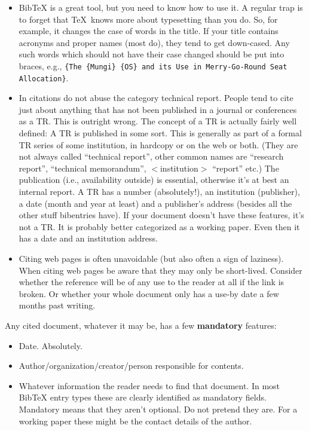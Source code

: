 \begin{itemize}
\item BibTeX is a great tool, but you need to know how to use it. A regular trap is to forget that \TeX~knows more about typesetting than you do. So, for example, it changes the case of words in the title. If your title contains acronyms and proper names (most do), they tend to get down-cased. Any such words which should not have their case changed should be put into braces, e.g., \verb|{The {Mungi} {OS} and its Use in Merry-Go-Round Seat Allocation}|.


\item In citations do not abuse the category technical report. People tend to cite just about anything that has not been published in a journal or conferences as a TR. This is outright wrong. The concept of a TR is actually fairly well defined: A TR is published in some sort. This is generally as part of a formal TR series of some institution, in hardcopy or on the web or both. (They are not always called ``technical report'', other common names are ``research report'', ``technical memorandum'', $<$institution$>$ ``report'' etc.) The publication (i.e., availability outside) is essential, otherwise it's at best an internal report.
A TR has a number (absolutely!), an institution (publisher), a date (month and year at least) and a publisher's address (besides all the other stuff bibentries have).
If your document doesn't have these features, it's not a TR. It is probably better categorized as a working paper. Even then it has a date and an institution address.

\item Citing web pages is often unavoidable (but also often a sign of laziness). When citing web pages be aware that they may only be short-lived. Consider whether the reference will be of any use to the reader at all if the link is broken. Or whether your whole document only has a use-by date a few months past writing.

\end{itemize}

Any cited document, whatever it may be, has a few \textbf{mandatory} features:
\begin{itemize}
	\item Date. Absolutely. 
	\item Author/organization/creator/person responsible for contents.
	\item Whatever information the reader needs to find that document. In most BibTeX entry types these are clearly identified as mandatory fields. Mandatory means that they aren't optional. Do not pretend they are. For a working paper these might be the contact details of the author.
\end{itemize}


